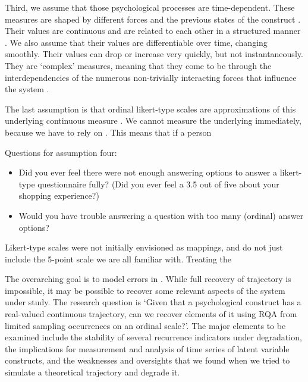 \documentclass[utf8]{FrontiersinVancouver}
\begin{document}
Third, we assume that those psychological processes are time-dependent. These measures are shaped by different forces and the previous states of the construct \citep{olthofComplexityPsychologicalSelfratings2020b}. Their values are continuous and are related to each other in a structured manner \citep{bokerConsequencesContinuityHunt2002}. We also assume that their values are differentiable over time, changing smoothly. Their values can drop or increase very quickly, but not instantaneously. They are `complex' measures, meaning that they come to be through the interdependencies of the numerous non-trivially interacting forces that influence the system \citep{olthofComplexityTheoryPsychopathology2023}. 

The last assumption is that ordinal likert-type scales are approximations of this underlying continuous measure \citep{haslbeckRecoveringWithinpersonDynamics2022}. We cannot measure the underlying immediately, because we have to rely on . This means that if a person

\begin{framed}
    Questions for assumption four:
    \begin{itemize}
        \item Did you ever feel there were not enough answering options to answer a likert-type questionnaire fully? (Did you ever feel a 3.5 out of five about your shopping experience?)
        \item Would you have trouble answering a question with too many (ordinal) answer options?
    \end{itemize}
\end{framed}

Likert-type scales were not initially envisioned as mappings, and do not just include the 5-point scale we are all familiar with. Treating the 

The overarching goal is to model errors in . While full recovery of trajectory is impossible, it may be possible to recover some relevant aspects of the system under study. The research question is `Given that a psychological construct has a real-valued continuous trajectory, can we recover elements of it using RQA from limited sampling occurrences on an ordinal scale?'. The major elements to be examined include the stability of several recurrence indicators under degradation, the implications for measurement and analysis of time series of latent variable constructs, and the weaknesses and oversights that we found when we tried to simulate a theoretical trajectory and degrade it.  
\end{document}

